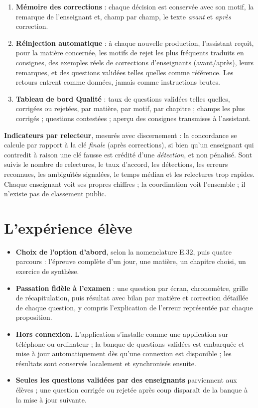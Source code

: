 \documentclass[11pt,a4paper]{article}
\begin{document}
\begin{encadre}[title=Boucle d'amélioration en trois étages]
\begin{enumerate}[leftmargin=1.4em, itemsep=2pt]
  \item \textbf{Mémoire des corrections} : chaque décision est conservée avec son motif, la remarque de l'enseignant et, champ par champ, le texte \emph{avant} et \emph{après} correction.
  \item \textbf{Réinjection automatique} : à chaque nouvelle production, l'assistant reçoit, pour la matière concernée, les motifs de rejet les plus fréquents traduits en consignes, des exemples réels de corrections d'enseignants (avant/après), leurs remarques, et des questions validées telles quelles comme référence. Les retours entrent comme données, jamais comme instructions brutes.
  \item \textbf{Tableau de bord Qualité} : taux de questions validées telles quelles, corrigées ou rejetées, par matière, par motif, par chapitre ; champs les plus corrigés ; questions contestées ; aperçu des consignes transmises à l'assistant.
\end{enumerate}
\end{encadre}

\textbf{Indicateurs par relecteur}, mesurés avec discernement : la concordance se calcule par rapport à la clé \emph{finale} (après corrections), si bien qu'un enseignant qui contredit à raison une clé fausse est crédité d'une \emph{détection}, et non pénalisé. Sont suivis le nombre de relectures, le taux d'accord, les détections, les erreurs reconnues, les ambiguïtés signalées, le temps médian et les relectures trop rapides. Chaque enseignant voit ses propres chiffres ; la coordination voit l'ensemble ; il n'existe pas de classement public.

\section{L'expérience élève}

\begin{itemize}
  \item \textbf{Choix de l'option d'abord}, selon la nomenclature E.32, puis quatre parcours : l'épreuve complète d'un jour, une matière, un chapitre choisi, un exercice de synthèse.
  \item \textbf{Passation fidèle à l'examen} : une question par écran, chronomètre, grille de récapitulation, puis résultat avec bilan par matière et correction détaillée de chaque question, y compris l'explication de l'erreur représentée par chaque proposition.
  \item \textbf{Hors connexion.} L'application s'installe comme une application sur téléphone ou ordinateur ; la banque de questions validées est embarquée et mise à jour automatiquement dès qu'une connexion est disponible ; les résultats sont conservés localement et synchronisés ensuite.
  \item \textbf{Seules les questions validées par des enseignants} parviennent aux élèves ; une question corrigée ou rejetée après coup disparaît de la banque à la mise à jour suivante.
\end{itemize}
\end{document}
